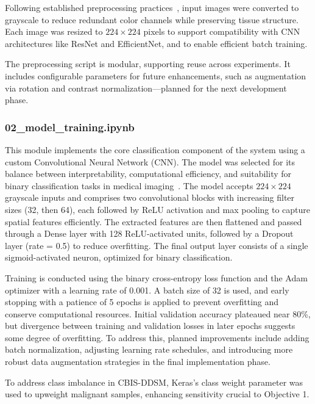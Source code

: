 \documentclass[12pt]{article}
\begin{document}
Following established preprocessing practices~\cite{7}, input images were converted to grayscale to reduce redundant color channels while preserving tissue structure. Each image was resized to $224 \times 224$ pixels to support compatibility with CNN architectures like ResNet and EfficientNet, and to enable efficient batch training.

The preprocessing script is modular, supporting reuse across experiments. It includes configurable parameters for future enhancements, such as augmentation via rotation and contrast normalization—planned for the next development phase.



\vspace{0.5em}

\subsubsection{02\_model\_training.ipynb}

This module implements the core classification component of the system using a custom Convolutional Neural Network (CNN). The model was selected for its balance between interpretability, computational efficiency, and suitability for binary classification tasks in medical imaging~\cite{17}. The model accepts $224 \times 224$ grayscale inputs and comprises two convolutional blocks with increasing filter sizes (32, then 64), each followed by ReLU activation and max pooling to capture spatial features efficiently. The extracted features are then flattened and passed through a Dense layer with 128 ReLU-activated units, followed by a Dropout layer (rate = 0.5) to reduce overfitting. The final output layer consists of a single sigmoid-activated neuron, optimized for binary classification.

Training is conducted using the binary cross-entropy loss function and the Adam optimizer with a learning rate of 0.001. A batch size of 32 is used, and early stopping with a patience of 5 epochs is applied to prevent overfitting and conserve computational resources. Initial validation accuracy plateaued near 80\%, but divergence between training and validation losses in later epochs suggests some degree of overfitting. To address this, planned improvements include adding batch normalization, adjusting learning rate schedules, and introducing more robust data augmentation strategies in the final implementation phase.

To address class imbalance in CBIS-DDSM, Keras’s class weight parameter was used to upweight malignant samples, enhancing sensitivity crucial to Objective 1.
\end{document}
